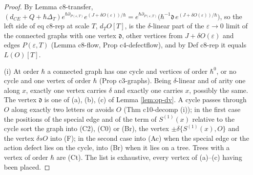 \documentclass[11pt]{article}
\numberwithin{equation}{section}
\theoremstyle{plain}
\theoremstyle{definition}
\begin{document}
\begin{proof}
By Lemma c8-transfer, $(d_{CE}+Q+\hbar\Delta_T)e^{\hbar\partial_{P(\varepsilon,T)}}e^{(J+\delta O(\varepsilon))/\hbar}=e^{\hbar\partial_{P(\varepsilon,T)}}\big(\hbar^{-1}\mathfrak d\,e^{(J+\delta O(\varepsilon))/\hbar}\big)$, so the left side of eq c8-rep at scale $T$, $d_TO[T]$, is the $\delta$-linear part of the $\varepsilon\to0$ limit of the connected graphs with one vertex $\mathfrak d$, other vertices from $J+\delta O(\varepsilon)$ and edges $P(\varepsilon,T)$ (Lemma c8-flow, Prop c4-defectflow), and by Def c8-rep it equals $L(O)[T]$.

(i) At order $\hbar$ a connected graph has one cycle and vertices of order $\hbar^0$, or no cycle and one vertex of order $\hbar$ (Prop c3-graphs). Being $\delta$-linear and of arity one along $x$, exactly one vertex carries $\delta$ and exactly one carries $x$, possibly the same. The vertex $\mathfrak d$ is one of (a), (b), (c) of Lemma \ref{lem:op-dv}. A cycle passes through $O$ along exactly two letters or avoids $O$ (Thm c10-decomp (i)); in the first case the positions of the special edge and of the term of $S^{(1)}(x)$ relative to the cycle sort the graph into (C2), (C0) or (Br), the vertex $\pm\delta\{S^{(1)}(x),O\}$ and the vertex $\delta sO$ into (F); in the second case into (Ac) when the special edge or the action defect lies on the cycle, into (Br) when it lies on a tree. Trees with a vertex of order $\hbar$ are (Ct). The list is exhaustive, every vertex of (a)--(c) having been placed.


\end{proof}
\end{document}
